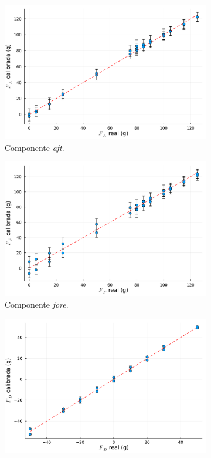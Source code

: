\begin{figure}[htbp]
    \centering
    \begin{subfigure}{\textwidth}\centering
        \includegraphics[height=.29\textheight]{img/results/calibration_FA.png}
        \caption{Componente \textit{aft}.}\label{fig:calibration_FA}
    \end{subfigure}
    \begin{subfigure}{\textwidth}\centering
        \includegraphics[height=.29\textheight]{img/results/calibration_FF.png}
        \caption{Componente \textit{fore}.}\label{fig:calibration_FF}
    \end{subfigure}
    \begin{subfigure}{\textwidth}\centering
        \includegraphics[height=.29\textheight]{img/results/calibration_FD.png}

\end{subfigure}
\end{figure}
